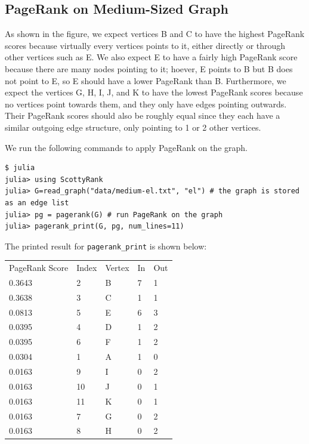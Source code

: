 \documentclass[12pt, titlepage, twoside]{amsart}
\begin{document}
\subsection{PageRank on Medium-Sized Graph}

As shown in the figure, we expect vertices B and C to have the highest PageRank scores
because virtually every vertices points to it, either directly or through other vertices such as E.
We also expect E to have a fairly high PageRank score because there are many nodes pointing to it;
hoever, E points to B but B does not point to E, so E should have a lower PageRank than B.
Furthermore, we expect the vertices G, H, I, J, and K to have the lowest PageRank scores because
no vertices point towards them, and they only have edges pointing outwards.
Their PageRank scores should also be roughly equal since they each have a similar outgoing edge structure,
only pointing to 1 or 2 other vertices.

We run the following commands to apply PageRank on the graph.

\begin{verbatim}
$ julia
julia> using ScottyRank
julia> G=read_graph("data/medium-el.txt", "el") # the graph is stored as an edge list
julia> pg = pagerank(G) # run PageRank on the graph
julia> pagerank_print(G, pg, num_lines=11)
\end{verbatim}

The printed result for \texttt{pagerank_print} is shown below:

\begin{table}[h]
\begin{tabular}{lllll}
PageRank Score & Index & Vertex & In & Out\\
    0.3643 &        2 &         B& 7 &         1 \\
    0.3638 &         3 &         C& 1 &         1 \\
    0.0813 &         5 &         E& 6 &         3 \\
    0.0395 &         4 &         D& 1 &         2 \\
    0.0395 &         6 &         F& 1 &         2 \\
    0.0304 &         1 &         A& 1 &         0 \\
    0.0163 &         9 &         I& 0 &         2 \\
    0.0163 &        10 &         J& 0 &         1 \\
    0.0163 &        11 &         K& 0 &         1 \\
    0.0163 &         7 &         G& 0 &         2 \\
    0.0163 &         8 &         H& 0 &          2\\
\end{tabular}
\end{table}
\end{document}
